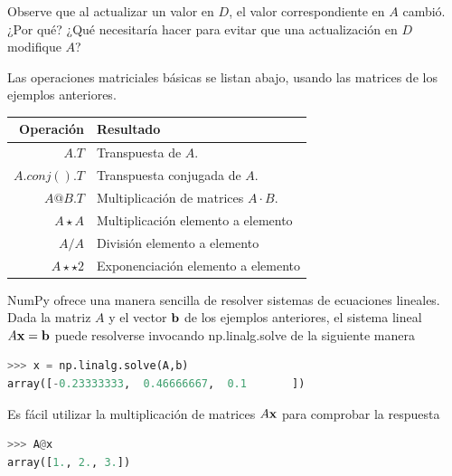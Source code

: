 Observe que al actualizar un valor en $D$, el valor correspondiente en $A$ cambió. ¿Por qué? ¿Qué necesitaría hacer para evitar que una actualización en $D$ modifique $A$? \QA

Las operaciones matriciales básicas se listan abajo, usando las matrices de los ejemplos anteriores.
\vs

\begin{tabular}{r|l}
Operación 		& Resultado \\
\hline
{\s$A.T$} 	&  Transpuesta de $A$.\\
{\s$A.conj().T$} 	&  Transpuesta conjugada de $A$.\\
{\s$A@B.T$} 			&  Multiplicación de matrices $A \cdot B$. \\
{\s$A\star A$} 		&  Multiplicación elemento a elemento\\
{\s$A/A$} 		&  División elemento a elemento\\
{\s$A\star\star 2$} 		&  Exponenciación elemento a elemento\\
\hline
\end{tabular}

\vs

NumPy ofrece una manera sencilla de resolver sistemas de ecuaciones lineales. Dada la matriz $A$ y el vector $\textbf{b}$ de los ejemplos anteriores, el sistema lineal $A\textbf{x} = \textbf{b}$ puede resolverse invocando {\s np.linalg.solve} de la siguiente manera

\begin{lstlisting}[language=Python]
>>> x = np.linalg.solve(A,b)
array([-0.23333333,  0.46666667,  0.1       ])
\end{lstlisting}

Es fácil utilizar la multiplicación de matrices $A\textbf{x}$ para comprobar la respuesta

\begin{lstlisting}[language=Python]
>>> A@x
array([1., 2., 3.])
\end{lstlisting}




